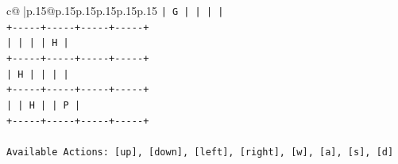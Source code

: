 \documentclass{article}
\begin{document}
{\begin{supertabular}{c@{$\;$}|p{.15\linewidth}@{}p{.15\linewidth}p{.15\linewidth}p{.15\linewidth}p{.15\linewidth}p{.15\linewidth}}
{{{\texttt{|  G  |     |     |     |} \\
\texttt{+{-}{-}{-}{-}{-}+{-}{-}{-}{-}{-}+{-}{-}{-}{-}{-}+{-}{-}{-}{-}{-}+} \\
\texttt{|     |     |     |  H  |} \\
\texttt{+{-}{-}{-}{-}{-}+{-}{-}{-}{-}{-}+{-}{-}{-}{-}{-}+{-}{-}{-}{-}{-}+} \\
\texttt{|  H  |     |     |     |} \\
\texttt{+{-}{-}{-}{-}{-}+{-}{-}{-}{-}{-}+{-}{-}{-}{-}{-}+{-}{-}{-}{-}{-}+} \\
\texttt{|     |  H  |     |  P  |} \\
\texttt{+{-}{-}{-}{-}{-}+{-}{-}{-}{-}{-}+{-}{-}{-}{-}{-}+{-}{-}{-}{-}{-}+} \\
\\ 
\texttt{Available Actions: {[}up{]}, {[}down{]}, {[}left{]}, {[}right{]}, {[}w{]}, {[}a{]}, {[}s{]}, {[}d{]}} \\
            }
        }
    }
     \\ \\


\end{supertabular}}
\end{document}
